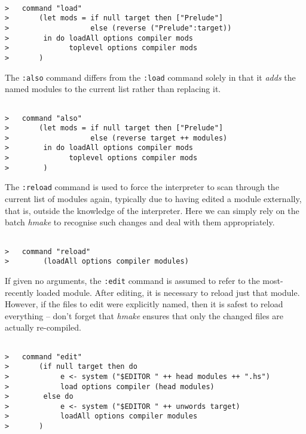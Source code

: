 \documentclass[a4paper]{article}
\begin{document}
\begin{verbatim}

>   command "load"
>       (let mods = if null target then ["Prelude"]
>                   else (reverse ("Prelude":target))
>        in do loadAll options compiler mods
>              toplevel options compiler mods
>       )

\end{verbatim}

The {\tt :also} command differs from the {\tt :load} command solely in
that it {\em adds} the named modules to the current list rather than
replacing it.

\begin{verbatim}

>   command "also"
>       (let mods = if null target then ["Prelude"]
>                   else (reverse target ++ modules)
>        in do loadAll options compiler mods
>              toplevel options compiler mods
>        )

\end{verbatim}

The {\tt :reload} command is used to force the interpreter to scan
through the current list of modules again, typically due to having
edited a module externally, that is, outside the knowledge of
the interpreter.  Here we can simply rely on the batch {\em hmake}
to recognise such changes and deal with them appropriately.

\begin{verbatim}

>   command "reload"
>        (loadAll options compiler modules)

\end{verbatim}

If given no arguments, the {\tt :edit} command is assumed to refer
to the most-recently loaded module.  After editing, it is necessary
to reload just that module.  However, if the files to edit were
explicitly named, then it is safest to reload everything -- don't
forget that {\em hmake} ensures that only the changed files are
actually re-compiled.

\begin{verbatim}

>   command "edit"
>       (if null target then do
>            e <- system ("$EDITOR " ++ head modules ++ ".hs")
>            load options compiler (head modules)
>        else do
>            e <- system ("$EDITOR " ++ unwords target)
>            loadAll options compiler modules
>       )

\end{verbatim}
\end{document}
